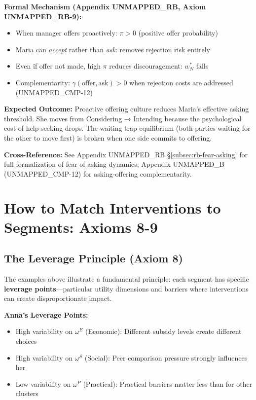 \textbf{Formal Mechanism (Appendix UNMAPPED_RB, Axiom UNMAPPED_RB-9):}
\begin{itemize}[nosep]
    \item When manager offers proactively: $\pi > 0$ (positive offer probability)
    \item Maria can \emph{accept} rather than \emph{ask}: removes rejection risk entirely
    \item Even if offer not made, high $\pi$ reduces discouragement: $w^*_N$ falls
    \item Complementarity: $\gamma(\text{offer}, \text{ask}) > 0$ when rejection costs
    are addressed (UNMAPPED_CMP-12)
\end{itemize}

\textbf{Expected Outcome:} Proactive offering culture reduces Maria's effective asking
threshold. She moves from Considering → Intending because the psychological cost of
help-seeking drops. The waiting trap equilibrium (both parties waiting for the other
to move first) is broken when one side commits to offering.

\textbf{Cross-Reference:} See Appendix UNMAPPED_RB §\ref{subsec:rb-fear-asking} for full formalization
of fear of asking dynamics; Appendix UNMAPPED_B (UNMAPPED_CMP-12) for asking-offering complementarity.

\section{How to Match Interventions to Segments: Axioms 8-9}
\label{sec:intervention-matching}

\subsection{The Leverage Principle (Axiom 8)}

The examples above illustrate a fundamental principle: each segment has specific
\textbf{leverage points}---particular utility dimensions and barriers where
interventions can create disproportionate impact.

\textbf{Anna's Leverage Points:}
\begin{itemize}[nosep]
\item High variability on $\omega^E$ (Economic): Different subsidy levels create different choices
\item High variability on $\omega^S$ (Social): Peer comparison pressure strongly influences her
\item Low variability on $\omega^P$ (Practical): Practical barriers matter less than for other clusters
\end{itemize}

